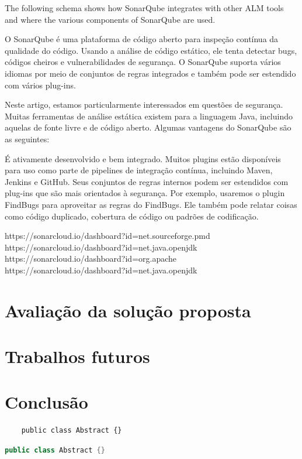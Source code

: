 \documentclass[12pt]{article}
\begin{document}
The following schema shows how SonarQube integrates with other ALM tools and where the various components of SonarQube are used.

O SonarQube é uma plataforma de código aberto para inspeção contínua da qualidade do código. Usando a análise de código estático, ele tenta detectar bugs, códigos cheiros e vulnerabilidades de segurança. O SonarQube suporta vários idiomas por meio de conjuntos de regras integrados e também pode ser estendido com vários plug-ins.

Neste artigo, estamos particularmente interessados em questões de segurança. Muitas ferramentas de análise estática existem para a linguagem Java, incluindo aquelas de fonte livre e de código aberto. Algumas vantagens do SonarQube são as seguintes:

     É ativamente desenvolvido e bem integrado. Muitos plugins estão disponíveis para uso como parte de pipelines de integração contínua, incluindo Maven, Jenkins e GitHub.
     Seus conjuntos de regras internos podem ser estendidos com plug-ins que são mais orientados à segurança. Por exemplo, usaremos o plugin FindBugs para aproveitar as regras do FindBugs.
     Ele também pode relatar coisas como código duplicado, cobertura de código ou padrões de codificação.

https://sonarcloud.io/dashboard?id=net.sourceforge.pmd%
https://sonarcloud.io/dashboard?id=net.java.openjdk%
https://sonarcloud.io/dashboard?id=org.apache%
https://sonarcloud.io/dashboard?id=net.java.openjdk%
		
\part{Avaliação da solução proposta} \label{sec:avaliacao}

\part{Trabalhos futuros} \label{sec:trabalhos_futuros}

\part{Conclusão} \label{sec:conclusao}

\begin{verbatim}
	public class Abstract {}
\end{verbatim}


\begin{lstlisting}[language=java]
	public class Abstract {}
\end{lstlisting}


%


\end{document}
